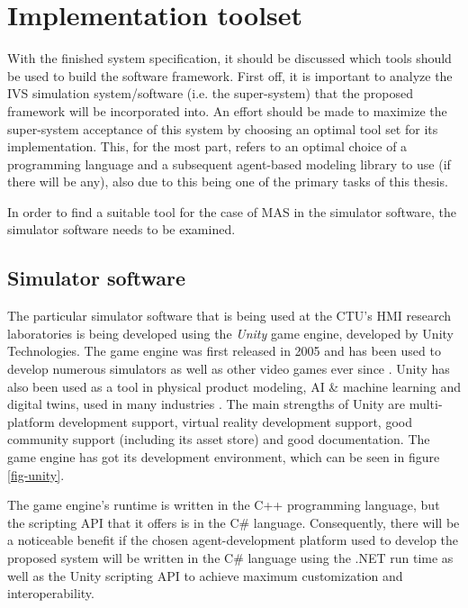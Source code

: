 \documentclass[0main.tex]{subfiles}
\begin{document}
\section{Implementation toolset}\label{sec-toolset}

With the finished system specification, it should be discussed which tools should be used to build the software framework. 
First off, it is important to analyze the IVS simulation system/software (i.e. the super-system) that
the proposed framework will be incorporated into. An effort should be made to maximize the super-system acceptance of 
this system by choosing an optimal tool set for its implementation. This, for the most part,
refers to an optimal choice of a programming language and a subsequent agent-based modeling
library to use (if there will be any), also due to this being one of the primary tasks of this thesis. 

In order to find a suitable tool for the case of MAS in the simulator software, the simulator software needs to be examined.

\subsection{Simulator software}

The particular simulator software that is being used at the CTU's HMI research laboratories is being
developed using the \emph{Unity} game engine, developed by Unity Technologies. The game engine
was first released in 2005 and has been used to develop numerous simulators as well as other
video games ever since \cite{UnityTechnologies2022}.  Unity has also been used as a tool in
physical product modeling, AI \& machine learning and digital twins, used in many industries
\cite{UnityTechnologies2022a}.  The main strengths of Unity are multi-platform development
support, virtual reality development support, good community support (including its asset
store) and good documentation. The game engine has got its development environment, which 
can be seen in figure \ref{fig-unity}.

The game engine's runtime is written in the C++ programming language, but the scripting API
that it offers is in the C\# language. Consequently, there will be a noticeable benefit if the
chosen agent-development platform used to develop the proposed system will be written in the
C\# language using the .NET run time as well as the Unity scripting API to achieve maximum
customization and interoperability.
\end{document}
